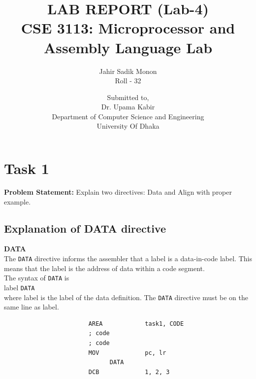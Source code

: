 \documentclass[footheight=20pt, footsepline, headheight=20pt, headsepline]{scrartcl}
\begin{document}
\title{LAB REPORT (Lab-4) \\[1cm] \large{\textbf{CSE 3113: Microprocessor and Assembly Language Lab}}\\[1cm]} 
\author{Jahir Sadik Monon \\ Roll - 32}
\date{\vspace{10cm}  Submitted to, \\[0.1cm] Dr. Upama Kabir \\[0.5cm] Department of Computer Science and Engineering \\[0.5cm] University Of Dhaka}
\maketitle
\newpage
\tableofcontents 
\newpage
\section*{Task 1}
\textbf{Problem Statement:} Explain two directives: Data and Align with proper example.
\subsection*{Explanation of DATA directive}
\textbf{DATA}\\
The \verb|DATA| directive informs the assembler that a label is a data-in-code label. This means that the label is the address of data within a code segment.\\
The syntax of \verb|DATA| is\\
\textup{label} \verb|DATA|\\
where \textup{label} is the label of the data definition. The \verb|DATA| directive must be on the same line as \textup{label}.
\begin{lstlisting}
                        AREA            task1, CODE
                        ; code
                        ; code
                        MOV             pc, lr
                              DATA
                        DCB             1, 2, 3
\end{lstlisting}
\end{document}
